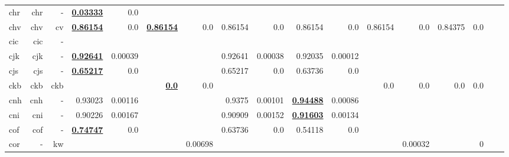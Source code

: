 \documentclass[11pt]{article}
\begin{document}
\begin{table*}[h]
{\begin{tabular}{lrrrrrrrrrrrrrrrr}
chr         & chr         & -         & \textbf{\underline{0.03333}}         & 0.0         &          &          &          &          &          &          &          &          &          &          \\
chv         & chv         & cv         & \textbf{\underline{0.86154}}         & 0.0         & \textbf{\underline{0.86154}}         & 0.0         & 0.86154         & 0.0         & 0.86154         & 0.0         & 0.86154         & 0.0         & 0.84375         & 0.0         \\
cic         & cic         & -         &          &          &          &          &          &          &          &          &          &          &          &          \\
cjk         & cjk         & -         & \textbf{\underline{0.92641}}         & 0.00039         &          &          & 0.92641         & 0.00038         & 0.92035         & 0.00012         &          &          &          &          \\
cjs         & cjs         & -         & \textbf{\underline{0.65217}}         & 0.0         &          &          & 0.65217         & 0.0         & 0.63736         & 0.0         &          &          &          &          \\
ckb         & ckb         & ckb         &          &          & \textbf{\underline{0.0}}         & 0.0         &          &          &          &          & 0.0         & 0.0         & 0.0         & 0.0         \\
cnh         & cnh         & -         & 0.93023         & 0.00116         &          &          & 0.9375         & 0.00101         & \textbf{\underline{0.94488}}         & 0.00086         &          &          &          &          \\
cni         & cni         & -         & 0.90226         & 0.00167         &          &          & 0.90909         & 0.00152         & \textbf{\underline{0.91603}}         & 0.00134         &          &          &          &          \\
cof         & cof         & -         & \textbf{\underline{0.74747}}         & 0.0         &          &          & 0.63736         & 0.0         & 0.54118         & 0.0         &          &          &          &          \\
cor         & -         & kw         &          &          &          & 0.00698         &          &          &          &          &          & 0.00032         &          & 0         \\

\end{tabular}}
\end{table*}
\end{document}
